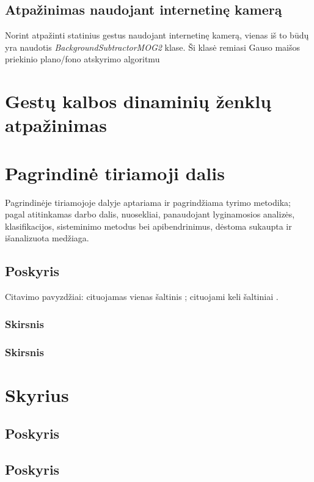 \documentclass{VUMIFInfKursinis}
\begin{document}
\subsection{Atpažinimas naudojant internetinę kamerą}
Norint atpažinti statinius gestus naudojant internetinę kamerą, vienas iš to būdų yra naudotis \textit{BackgroundSubtractorMOG2} klase. Ši klasė remiasi Gauso maišos priekinio plano/fono atskyrimo algoritmu


\section{Gestų kalbos dinaminių ženklų atpažinimas}


\section{Pagrindinė tiriamoji dalis}
Pagrindinėje tiriamojoje dalyje aptariama ir pagrindžiama tyrimo metodika;
pagal atitinkamas darbo dalis, nuosekliai, panaudojant lyginamosios analizės,
klasifikacijos, sisteminimo metodus bei apibendrinimus, dėstoma sukaupta ir
išanalizuota medžiaga.

\subsection{Poskyris}
Citavimo pavyzdžiai: cituojamas vienas šaltinis \cite{PvzStraipsnLt}; cituojami
keli šaltiniai \cite{PvzStraipsnEn, PvzKonfLt, PvzKonfEn, PvzKnygLt, PvzKnygEn,
PvzElPubLt, PvzElPubEn, PvzMagistrLt, PvzPhdEn}.

\subsubsection{Skirsnis}
\subsubsection{Skirsnis}
\section{Skyrius}
\subsection{Poskyris}
\subsection{Poskyris}
\end{document}
